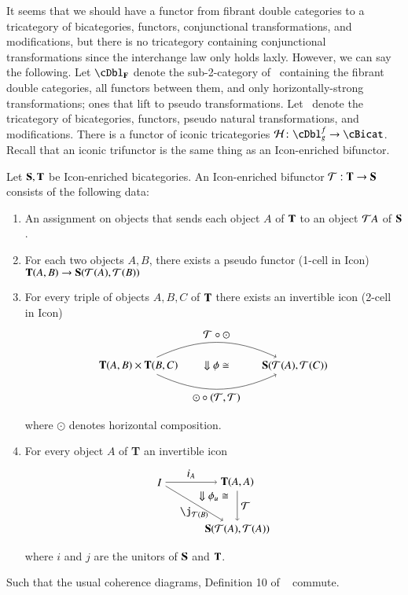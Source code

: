 \documentclass{amsart}
\begin{document}
 



It seems that we should have a functor from fibrant double categories
to a tricategory of bicategories, functors, conjunctional
transformations, and modifications, but there is no tricategory
containing conjunctional transformations since the interchange law
only holds laxly.  However, we can say the following.  Let $\cDbl_{\bf F}$
denote the sub-2-category of \cDbl\ containing the fibrant double
categories, all functors between them, and only horizontally-strong transformations; ones that lift to pseudo transformations. Let \cBicat\ denote the tricategory of
bicategories, functors, pseudo natural transformations, and
modifications.  There is a functor of iconic tricategories $\cH\maps \cDbl^f_g\to \cBicat$. Recall that an iconic trifunctor is the same thing as an Icon-enriched bifunctor.

\begin{defn}\label{def:Iconfunc}
Let ${\bf S,T}$ be Icon-enriched bicategories. An Icon-enriched bifunctor $\mathcal{T}: {\bf T} \rightarrow {\bf S}$ consists of the following data:
\begin{enumerate}
\item An assignment on objects that sends each object $A$ of ${\bf T}$ to an object $\mathcal{T} A$ of ${\bf S}$.
\item For each two objects $A,B$, there exists a pseudo functor (1-cell in Icon) ${\bf T}(A,B) \rightarrow {\bf S}(\mathcal{T}(A),\mathcal{T}(B))$
\item For every triple of objects $A,B,C$ of ${\bf T}$ there exists an invertible icon (2-cell in Icon) 
\begin{align} 
\begin{tikzpicture}
\node(1) at (0,0) {${\bf T}(A,B) \times {\bf T}(B,C)$};
\node(2) at (5,0) {${\bf S}(\cT(A),\cT(C))$};
\draw[->] (1) to[in=155, out=25] node[above]{$\cT \circ \odot$} (2); 
\draw[->] (1) to[in=-155, out=-25] node[below]{$\odot \circ (\cT,\cT)$} (2); 
\node at (2.5,0) {$\Downarrow \phi \iso$};
\end{tikzpicture}
\end{align}
where $\odot$ denotes horizontal composition.
\item For every object $A$ of {\bf T} an invertible icon
\begin{align}
\begin{tikzpicture}[xscale=.5, yscale=.3]
\node(1) at (0,0) {$I$};
\node(2) at (5,0) {${\bf T}(A,A)$};
\node(3) at (5,-5) {${\bf S}(\cT(A),\cT(A))$};
\draw[->] (1) to node[above]{$i_{A}$} (2); 
\draw[->] (1) to node[below]{$\j_{\cT(B)}$} (3);
\draw[->] (2) to node[right]{$\cT$} (3); 
\node at (3.5,-1.5) {$\Downarrow \phi_u \iso$};
\end{tikzpicture}
\end{align}
where $i$ and $j$ are the unitors of ${\bf S}$ and ${\bf T}$.
\end{enumerate}
Such that the usual coherence diagrams, Definition 10 of ~\cite{nick:tricatsbook} commute.
\end{defn}
\end{document}
